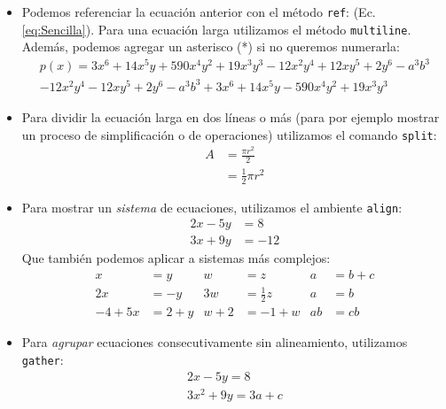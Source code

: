 \documentclass{assignment}
\begin{document}
\begin{problem}
\begin{itemize}
    \item Podemos referenciar la ecuación anterior con el método \texttt{ref}: (Ec. \ref{eq:Sencilla}). Para una ecuación larga utilizamos el método \texttt{multiline}. Además, podemos agregar un asterisco (*) si no queremos numerarla:
    \begin{multline*}
        p(x) = 3x^6 + 14x^5y + 590x^4y^2 + 19x^3y^3 - 12x^2y^4 + 12xy^5 + 2y^6 - a^3b^3\\ 
            - 12x^2y^4 - 12xy^5 + 2y^6 - a^3b^3 + 3x^6 + 14x^5y - 590x^4y^2 + 19x^3y^3
    \end{multline*}

    \item Para dividir la ecuación larga en dos líneas o más (para por ejemplo mostrar un proceso de simplificación o de operaciones) utilizamos el comando \texttt{split}:
    \begin{equation} \label{eq1}
        \begin{split}
            A & = \frac{\pi r^2}{2} \\
             & = \frac{1}{2} \pi r^2
        \end{split}
    \end{equation}

    \item Para mostrar un \textit{sistema} de ecuaciones, utilizamos el ambiente \texttt{align}: 
    \begin{align*} 
        2x - 5y &=  8 \\ 
        3x + 9y &=  -12
    \end{align*}
    Que también podemos aplicar a sistemas más complejos:
    \begin{align*}
        x&=y           &  w &=z              &  a&=b+c\\
        2x&=-y         &  3w&=\frac{1}{2}z   &  a&=b\\
        -4 + 5x&=2+y   &  w+2&=-1+w          &  ab&=cb
    \end{align*}    

    \item Para \textit{agrupar} ecuaciones consecutivamente sin alineamiento, utilizamos \texttt{gather}:
    \begin{gather*} 
        2x - 5y =  8 \\ 
        3x^2 + 9y =  3a + c
    \end{gather*}
\end{itemize}


\end{problem}
\end{document}
